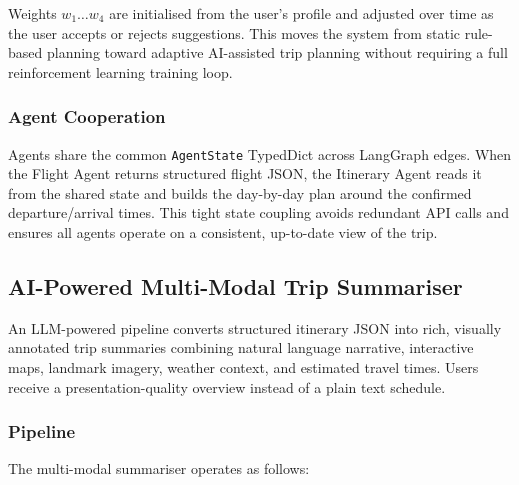 \documentclass[12pt, a4paper]{article}
\begin{document}
Weights $w_1\ldots w_4$ are initialised from the user's profile and adjusted over time as the user accepts or rejects suggestions. This moves the system from static rule-based planning toward adaptive AI-assisted trip planning without requiring a full reinforcement learning training loop.

\subsubsection{Agent Cooperation}

Agents share the common \texttt{AgentState} TypedDict across LangGraph edges. When the Flight Agent returns structured flight JSON, the Itinerary Agent reads it from the shared state and builds the day-by-day plan around the confirmed departure/arrival times. This tight state coupling avoids redundant API calls and ensures all agents operate on a consistent, up-to-date view of the trip.

\subsection{AI-Powered Multi-Modal Trip Summariser}

\begin{highlightbox}
An LLM-powered pipeline converts structured itinerary JSON into rich, visually annotated trip summaries combining natural language narrative, interactive maps, landmark imagery, weather context, and estimated travel times. Users receive a presentation-quality overview instead of a plain text schedule.
\end{highlightbox}

\subsubsection{Pipeline}

The multi-modal summariser operates as follows:
\end{document}
